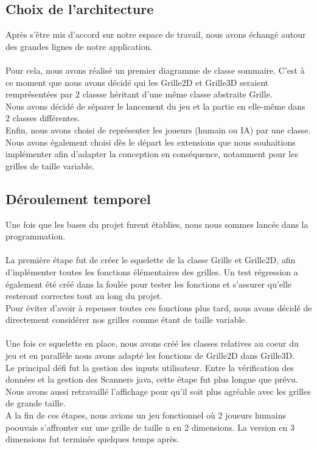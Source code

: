 \documentclass{article}
\begin{document}
 \subsection{Choix de l'architecture}
 Après s'être mis d'accord sur notre espace de travail, nous avons échangé autour des grandes lignes de notre application.\\ \\
 
 Pour cela, nous avons réalisé un premier diagramme de classe sommaire. C'est à ce moment que nous avons décidé qui les Grille2D et Grille3D seraient remprésentées par 2 classse héritant d'une même classe abstraite Grille.\\
 Nous avons décidé de séparer le lancement du jeu et la partie en elle-même dans 2 classes différentes.\\
 Enfin, nous avons choisi de représenter les joueurs (humain ou IA) par une classe.\\

 Nous avons également choisi dès le départ les extensions que nous souhaitions implémenter afin d'adapter la conception en conséquence, notamment pour les grilles de taille variable. \\

 
 \subsection{Déroulement temporel}
Une fois que les bases du projet furent établies, nous nous sommes lancés dans la programmation.\\ \\

La première étape fut de créer le squelette de la classe Grille et Grille2D, afin d'inplémenter toutes les fonctions élémentaires des grilles. Un test régression a également été créé dans la foulée pour tester les fonctions et s'assurer qu'elle resteront correctes tout au long du projet.\\
Pour éviter d'avoir à repenser toutes ces fonctions plus tard, nous avons décidé de directement considérer nos grilles comme étant de taille variable.\\ \\

Une fois ce squelette en place, nous avons créé les classes relatives au coeur du jeu et en parallèle nous avons adapté les fonctions de Grille2D dans Grille3D.\\
Le principal défi fut la gestion des inputs utilisateur. Entre la vérification des données et la gestion des Scanners java, cette étape fut plus longue que prévu.\\
Nous avons aussi retravaillé l'affichage pour qu'il soit plus agréable avec les grilles de grande taille.\\
A la fin de ces étapes, nous avions un jeu fonctionnel où 2 joueurs humains poouvais s'affronter sur une grille de taille n en 2 dimensions. La version en 3 dimensions fut terminée quelques temps après.\\ \\
\end{document}
